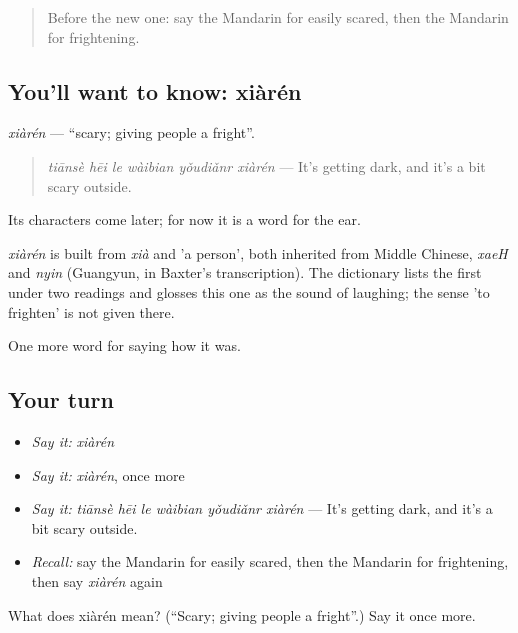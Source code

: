 \begin{quote}
Before the new one: say the Mandarin for easily scared, then the Mandarin for frightening.
\end{quote}

\subsection*{You'll want to know: xiàrén}
\emph{xiàrén} — \textquotedblleft{}scary; giving people a fright\textquotedblright{}.

\begin{quote}
\emph{tiānsè hēi le wàibian yǒudiǎnr xiàrén} — It's getting dark, and it's a bit scary outside.
\end{quote}

Its characters come later; for now it is a word for the ear.

\begin{cousinweb}
\emph{xiàrén} is built from \emph{xià} and  'a person', both inherited from Middle Chinese, \emph{xaeH} and \emph{nyin} (Guangyun, in Baxter's transcription). The dictionary lists the first under two readings and glosses this one as the sound of laughing; the sense 'to frighten' is not given there.
\end{cousinweb}

\begin{grammarlens}[title={What you've built}]
One more word for saying how it was.
\end{grammarlens}

\subsection*{Your turn}
\begin{itemize}
\raggedright
  \item \emph{Say it:} \emph{xiàrén}
  \item \emph{Say it:} \emph{xiàrén}, once more
  \item \emph{Say it:} \emph{tiānsè hēi le wàibian yǒudiǎnr xiàrén} — It's getting dark, and it's a bit scary outside.
  \item \emph{Recall:} say the Mandarin for easily scared, then the Mandarin for frightening, then say \emph{xiàrén} again
\end{itemize}

\begin{tcolorbox}[breakable,colback=teal!4,colframe=teal!35!black,title={Before you move on}]
What does xiàrén mean? (\textquotedblleft{}Scary; giving people a fright\textquotedblright{}.) Say it once more.
\end{tcolorbox}
